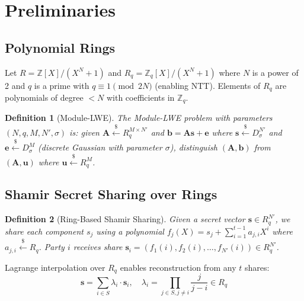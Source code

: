 \documentclass[11pt,a4paper]{article}
\newtheorem{definition}{Definition}[section]
\begin{document}
\section{Preliminaries}
\label{sec:prelim}

\subsection{Polynomial Rings}

Let $R = \mathbb{Z}[X]/(X^N + 1)$ and $R_q = \mathbb{Z}_q[X]/(X^N + 1)$ where $N$ is
a power of 2 and $q$ is a prime with $q \equiv 1 \pmod{2N}$ (enabling NTT). Elements
of $R_q$ are polynomials of degree $< N$ with coefficients in $\mathbb{Z}_q$.

\begin{definition}[Module-LWE]
The Module-LWE problem with parameters $(N, q, M, N', \sigma)$ is: given
$\mathbf{A} \stackrel{\$}{\leftarrow} R_q^{M \times N'}$ and $\mathbf{b} = \mathbf{A}\mathbf{s} + \mathbf{e}$
where $\mathbf{s} \stackrel{\$}{\leftarrow} D_\sigma^{N'}$ and $\mathbf{e} \stackrel{\$}{\leftarrow} D_\sigma^M$
(discrete Gaussian with parameter $\sigma$), distinguish $(\mathbf{A}, \mathbf{b})$ from
$(\mathbf{A}, \mathbf{u})$ where $\mathbf{u} \stackrel{\$}{\leftarrow} R_q^M$.
\end{definition}

\subsection{Shamir Secret Sharing over Rings}

\begin{definition}[Ring-Based Shamir Sharing]
Given a secret vector $\mathbf{s} \in R_q^{N'}$, we share each component $s_j$ using a
polynomial $f_j(X) = s_j + \sum_{i=1}^{t-1} a_{j,i} X^i$ where $a_{j,i} \stackrel{\$}{\leftarrow} R_q$.
Party $i$ receives share $\mathbf{s}_i = (f_1(i), f_2(i), \ldots, f_{N'}(i)) \in R_q^{N'}$.
\end{definition}

Lagrange interpolation over $R_q$ enables reconstruction from any $t$ shares:
\begin{equation}
\mathbf{s} = \sum_{i \in S} \lambda_i \cdot \mathbf{s}_i, \quad
\lambda_i = \prod_{j \in S, j \neq i} \frac{j}{j - i} \in R_q
\label{eq:lagrange}
\end{equation}
\end{document}

